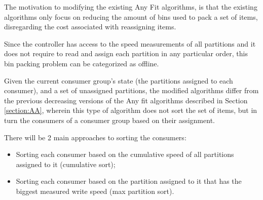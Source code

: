The motivation to modifying the existing Any Fit algorithms, is that the
existing algorithms only focus on reducing the amount of bins used to pack
a set of items, disregarding the cost associated with reassigning items.

Since the controller has access to the speed measurements of all partitions and
it does not require to read and assign each partition in any particular order,
this bin packing problem can be categorized as offline.

Given the current consumer group's state (the partitions assigned to each
consumer), and a set of unassigned partitions, the modified algorithms differ
from the previous decreasing versions of the Any fit algorithms described in
Section \ref{section:AA}, wherein this type of algorithm does not sort the set
of items, but in turn the consumers of a consumer group based on their
assignment. 

There will be 2 main approaches to sorting the consumers: 
\begin{itemize} 
    \item Sorting each consumer based on the cumulative speed of all partitions
        assigned to it (cumulative sort); 
    \item Sorting each consumer based on the partition assigned to it that has
        the biggest measured write speed (max partition sort).  
\end{itemize}


